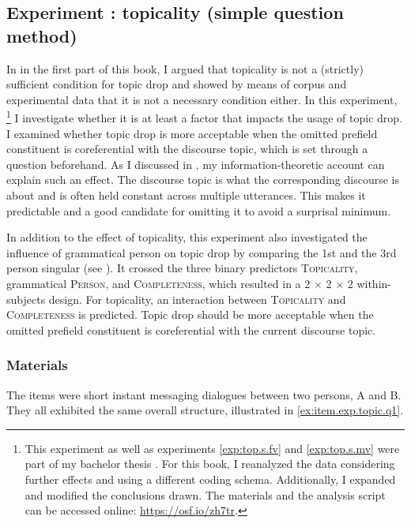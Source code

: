 \label{exp:top.q1}
\subsection{Experiment : topicality (simple question method) }
\label{sec:exp.top.q1.top}
In  in the first part of this book, I argued that topicality is not a (strictly) sufficient condition for topic drop and showed by means of corpus and experimental data that it is not a necessary condition either.
In this experiment,%
%
\footnote{This experiment as well as experiments \ref*{exp:top.s.fv} and \ref*{exp:top.s.mv} were part of my bachelor thesis \citep{schafer2019}.
For this book, I reanalyzed the data considering further effects and using a different coding schema.
Additionally, I expanded and modified the conclusions drawn.
The materials and the analysis script can be accessed online: \url{https://osf.io/zh7tr}.}
%
I investigate whether it is at least a factor that impacts the usage of topic drop.
I examined whether topic drop is more acceptable when the omitted prefield constituent is coreferential with the discourse topic,  which is set through a question beforehand.
As I discussed in , my information-theoretic  account can explain such an effect.
The discourse topic  is what the corresponding discourse is about and is often held constant across multiple utterances.
This makes it predictable  and a good candidate for omitting it to avoid a surprisal minimum.

In addition to the effect of topicality, this experiment also investigated the influence of grammatical person on topic drop by comparing the 1st and the 3rd person singular (see ).
It crossed the three binary predictors \textsc{Topicality}, grammatical \textsc{Person}, and \textsc{Completeness}, which resulted in a 2 $\times$ 2 $\times$ 2 within-subjects design.
For topicality, an interaction between \textsc{Topicality} and \textsc{Completeness} is predicted.
Topic drop should be more acceptable when the omitted prefield constituent is coreferential with the current discourse topic. 

\subsubsection{Materials}\label{sec:exp.top.q1.mat}
The items were short instant messaging dialogues between two persons, A and B.
They all exhibited the same overall structure, illustrated in \ref{ex:item.exp.topic.q1}.

